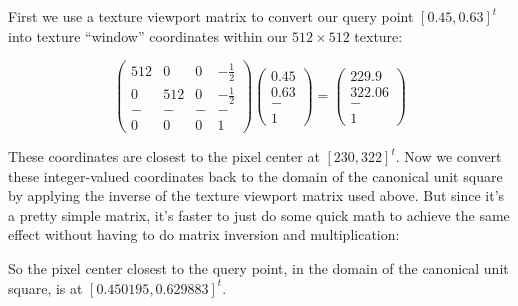 \documentclass[11pt]{tingpset}
\begin{document}

  First we use a texture viewport matrix to convert our query point $[0.45, 0.63]^t$ into texture ``window'' coordinates within our $512 \times 512$ texture:

  \[
    \begin{pmatrix}
      512 & 0 & 0 & -\frac{1}{2} \\
      0 & 512 & 0 & -\frac{1}{2} \\
      - & - & - & - \\
      0 & 0 & 0 & 1
    \end{pmatrix}
    \begin{pmatrix}
      0.45 \\
      0.63 \\
      - \\
      1
    \end{pmatrix}
    =
    \begin{pmatrix}
      229.9 \\
      322.06 \\
      - \\
      1
    \end{pmatrix}
  \]

  These coordinates are closest to the pixel center at $[230, 322]^t$. Now we convert these integer-valued coordinates back to the domain of the canonical unit square by applying the inverse of the texture viewport matrix used above. But since it's a pretty simple matrix, it's faster to just do some quick math to achieve the same effect without having to do matrix inversion and multiplication:


  So the pixel center closest to the query point, in the domain of the canonical unit square, is at $[0.450195, 0.629883]^t$.


  \todo
\end{document}
